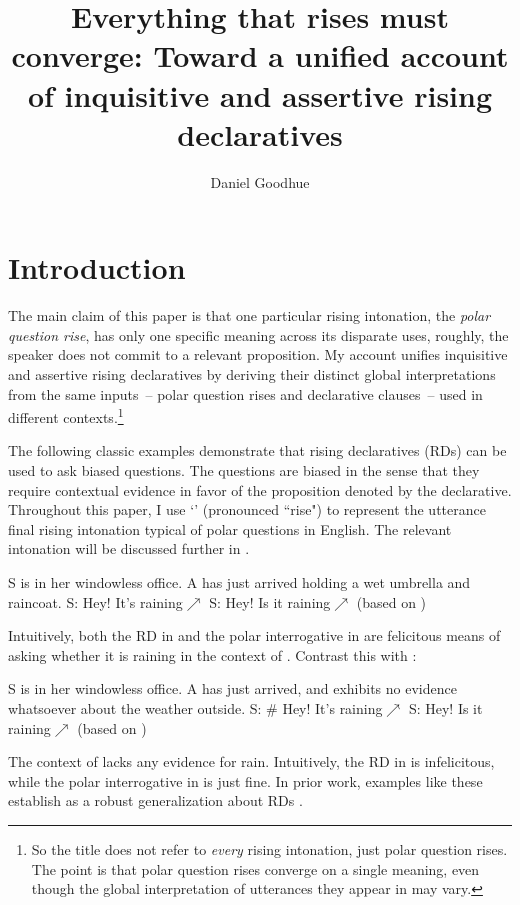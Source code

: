 \documentclass[output=paper,colorlinks,citecolor=brown]{langscibook}
\author{Daniel Goodhue\orcid{0000-0003-0900-6727}\affiliation{Leibniz-Zentrum Allgemeine Sprachwissenschaft (ZAS)}}
\title[Everything that rises must converge]{Everything that rises must converge: Toward a unified account of inquisitive and assertive rising declaratives}
\begin{document}
	
\maketitle
	
\section{Introduction}
The main claim of this paper is that one particular rising intonation, the \emph{polar question rise}, has only one specific meaning across its disparate uses, roughly, the speaker does not commit to a relevant proposition.  My account unifies inquisitive and assertive rising declaratives by deriving their distinct global interpretations from the same inputs~-- polar question rises and declarative clauses~-- used in different contexts.\footnote{So the title does not refer to \emph{every} rising intonation, just polar question rises. The point is that polar question rises converge on a single meaning, even though the global interpretation of utterances they appear in may vary.}
	
The following classic examples demonstrate that rising declaratives (RDs) can be used to ask biased questions. The questions are biased in the sense that they require contextual evidence in favor of the proposition denoted by the declarative. Throughout this paper, I use `\rise' (pronounced ``rise") to represent the utterance final rising intonation typical of polar questions in English. The relevant intonation will be discussed further in . 
	
	\exa S is in her windowless office. A has just arrived holding a wet umbrella and raincoat. \label{rainEv}
	\ea S: Hey! It's raining$\nearrow$ \label{rdRainEv}
	\ex S: Hey! Is it raining$\nearrow$ \label{piRainEv} \hfill (based on \citealt[96]{gunlogson03})
	\z
	\z
	
	Intuitively, both the RD in  and the polar interrogative in  are felicitous means of asking whether it is raining in the context of . Contrast this with :
	
	\exa S is in her windowless office. A has just arrived, and exhibits no evidence whatsoever about the weather outside. \label{ex:13:rain}
	\ea S: \# Hey! It's raining$\nearrow$ \label{rdRain}
	\ex S: Hey! Is it raining$\nearrow$ \label{piRain} \hfill (based on \citealt[95]{gunlogson03})
	\z
	\z
	
	The context of  lacks any evidence for rain. Intuitively, the RD in  is infelicitous, while the polar interrogative in  is just fine. In prior work, examples like these establish  as a robust generalization about RDs \citep[see e.g.][]{beun00, gunlogson03, gunlogson08, truckenbrodt06, truckenbrodt09, truckenbrodt12, trinh11, malamud15, farkas17, krifka17, westera17, westera18, jeong18, rudin18, rudin22}.
	
\end{document}
